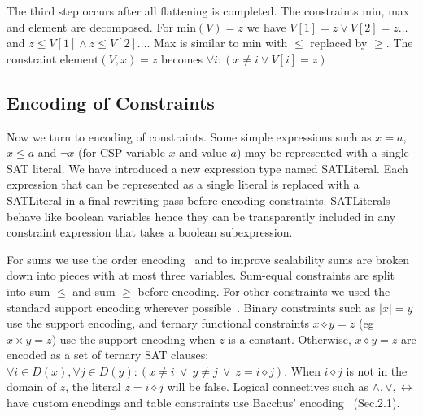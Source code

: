 \documentclass[a4paper]{article}
\begin{document}
The third step occurs after all flattening is completed. The constraints min, max and element are decomposed. For $\mathrm{min}(V)=z$ we have $V[1]=z \vee V[2]=z \ldots$ and $z\le V[1] \wedge z\le V[2] \ldots$. Max is similar to min with $\le$ replaced by $\ge$. The constraint $\mathrm{element}(V, x)=z$ becomes $\forall i : (x\ne i \vee V[i]=z)$. 

\subsection{Encoding of Constraints}

Now we turn to encoding of constraints. Some simple expressions such as $x=a$, $x\le a$ and $\neg x$ (for CSP variable $x$ and value $a$) may be represented with a single SAT literal. We have introduced a new expression type named SATLiteral. Each expression that can be represented as a single literal is replaced with a SATLiteral in a final rewriting pass before encoding constraints. SATLiterals behave like boolean variables hence they can be transparently included in any constraint expression that takes a boolean subexpression. 

For sums we use the order encoding~\cite{tamura2009compiling} and to improve scalability sums are broken down into pieces with at most three variables.  Sum-equal constraints are split into sum-$\le$ and sum-$\ge$ before encoding. For other constraints we used the standard support encoding wherever possible~\cite{gent-encodings-02}. Binary constraints such as $|x|=y$ use the support encoding, and ternary functional constraints $x\diamond y=z$ (eg $x\times y=z$) use the support encoding when $z$ is a constant. Otherwise, $x\diamond y=z$ are encoded as a set of ternary SAT clauses: $\forall i \in D(x), \forall j \in D(y): (x\ne i \: \vee\: y\ne j \: \vee\: z=i\diamond j)$. When $i\diamond j$ is not in the domain of $z$, the literal $z=i\diamond j$ will be false. 
Logical connectives such as $\wedge, \vee, \leftrightarrow$ have custom encodings and table constraints use Bacchus' encoding~\cite{bacchus2007gac} (Sec.2.1). 




\end{document}
